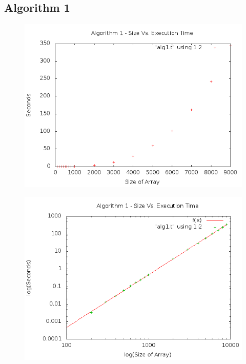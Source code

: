 \documentclass[a4paper,10pt]{article}
\begin{document}
		\subsection{Algorithm 1}
			\begin{figure}[!htb]
				\centering
				\includegraphics[scale=.5]{timingfiles/alg1plot.png}
			\end{figure}
			\begin{figure}[!htb]
				\centering
				\includegraphics[scale=.5]{timingfiles/alg1plotlog.png}
			\end{figure}

		\newpage
\end{document}

